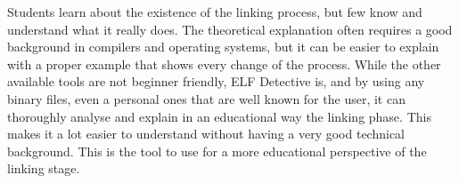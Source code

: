
Students learn about the existence of the linking process, but few know and understand what it really does. The theoretical explanation often requires a good background in compilers and operating systems, but it can be easier to explain with a proper example that shows every change of the process. While the other available tools are not beginner friendly, ELF Detective is, and by using any binary files, even a personal ones that are well known for the user, it can thoroughly analyse and explain in an educational way the linking phase. This makes it a lot easier to understand without having a very good technical background. This is the tool to use for a more educational perspective of the linking stage.